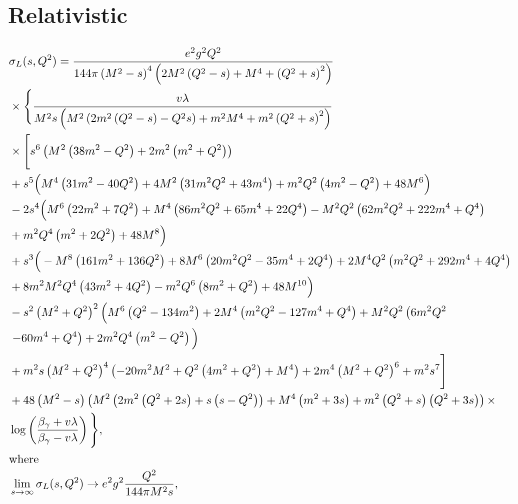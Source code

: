 \documentclass[prl,
twocolumn,
showpacs,preprintnumbers,amsmath,amssymb,
superscriptaddress,
a4paper,nofootinbib,longbibliography]{revtex4-2}
\begin{document}
\subsection{Relativistic}
\begin{align}
    &\sigma_L(s,Q^2)=
    \frac{e^2 g^2 Q^2}
        {144 \pi  \left(M^2-s\right)^4
        \left(2 M^2\left(Q^2-s\right)+M^4+\left(Q^2+s\right)^2\right)
        }\nonumber\\
   &\times
   \Bigg\{
   \frac{
        v\lambda
        }
            {M^2 s \left(M^2 \left(2 m^2 \left(Q^2-s\right)-Q^2 s\right)+m^2 M^4+m^2\left(Q^2+s\right)^2\right)
        }\nonumber\\
   &\times
   \Bigg[s^6 \left(M^2 \left(38m^2-Q^2\right)+2 m^2 \left(m^2+Q^2\right)\right)\nonumber\\
   &+s^5 \Big(M^4 \left(31 m^2-40 Q^2\right)+4 M^2 \left(31 m^2 Q^2+43 m^4\right)+m^2 Q^2 \left(4 m^2-Q^2\right)+48M^6\Big)\nonumber\\
   &-2 s^4 \Big(M^6 \left(22 m^2+7 Q^2\right)+M^4 \left(86 m^2 Q^2+65 m^4+22 Q^4\right)-M^2 Q^2 \left(62 m^2 Q^2+222 m^4+Q^4\right)\nonumber\\
   &+m^2 Q^4 \left(m^2+2Q^2\right)+48 M^8\Big)\nonumber\\
   &+s^3 \Big(-M^8 \left(161 m^2+136 Q^2\right)+8 M^6 \left(20 m^2 Q^2-35 m^4+2 Q^4\right)+2 M^4 Q^2 \left(m^2 Q^2+292 m^4+4 Q^4\right)\nonumber\\
   &+8 m^2 M^2 Q^4 \left(43 m^2+4 Q^2\right)-m^2 Q^6 \left(8 m^2+Q^2\right)+48 M^{10}\Big)\nonumber\\
   &-s^2 \left(M^2+Q^2\right)^2 \Big(M^6 \left(Q^2-134 m^2\right)+2 M^4 \left(m^2 Q^2-127 m^4+Q^4\right)+M^2 Q^2 \left(6 m^2 Q^2\right.\nonumber\\
   &\left.-60 m^4+Q^4\right)+2 m^2 Q^4 \left(m^2-Q^2\right)\Big)\nonumber\\
   &+m^2 s \left(M^2+Q^2\right)^4 \left(-20 m^2 M^2+Q^2 \left(4
   m^2+Q^2\right)+M^4\right)+2 m^4 \left(M^2+Q^2\right)^6+m^2 s^7\Bigg]\nonumber\\
   &+48 \left(M^2-s\right) \left(M^2 \left(2 m^2 \left(Q^2+2 s\right)+s \left(s-Q^2\right)\right)+M^4 \left(m^2+3 s\right)+m^2
   \left(Q^2+s\right) \left(Q^2+3 s\right)\right) \nonumber\times\\
   &\log \left(\frac{\beta_\gamma+v\lambda}{\beta_\gamma-v\lambda}\right)\Bigg\},\\
   \intertext{where}
   &\lim_{s\rightarrow\infty}\sigma_L(s,Q^2)\rightarrow e^2g^2\frac{Q^2}{144\pi M^2s},\\

\end{align}
\end{document}
